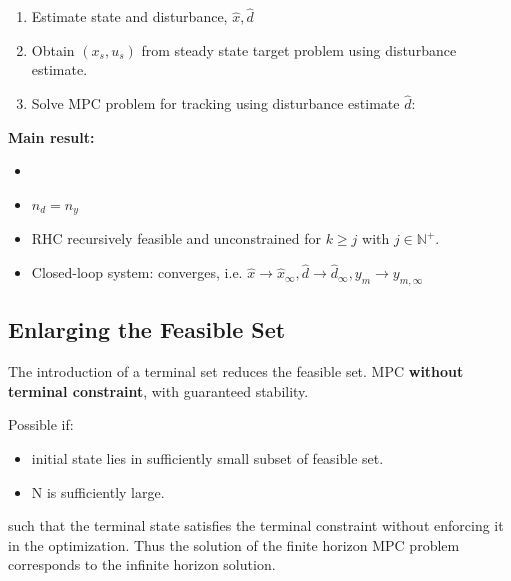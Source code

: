 \documentclass[8pt,a4paper]{scrartcl}
\begin{document}
\begin{multicols*}{3}
\begin{enumerate}
\ncompaq
\item Estimate state and disturbance, $\hat{x},\hat{d}$
\item Obtain $(x_s,u_s)$ from steady state target problem using disturbance estimate.
\item Solve MPC problem for tracking using disturbance estimate $\hat{d}$:
\end{enumerate}


\textbf{Main result:}

\finn

\begin{itemize}
\ncompaq
\item {}
\item $n_d=n_y$
\item RHC recursively feasible and unconstrained for $k\geq j$ with $j\in\mathbb{N}^+$.
\item Closed-loop system:
converges, i.e. $\hat{x}\rightarrow\hat{x}_\infty, \hat{d}\rightarrow\hat{d}_\infty,y_m\rightarrow y_{m,\infty}$
\end{itemize}


\subsection{Enlarging the Feasible Set}

The introduction of a terminal set reduces the feasible set. \dahe MPC \textbf{without terminal constraint}, with guaranteed stability.

\finn

Possible if:
\begin{itemize}
\ncompaq
\item initial state lies in sufficiently small subset of feasible set.
\item N is sufficiently large.
\end{itemize}

such that the terminal state satisfies the terminal constraint without enforcing it in the optimization. Thus the solution of the finite horizon MPC problem corresponds to the infinite horizon solution.


\end{multicols*}
\end{document}
